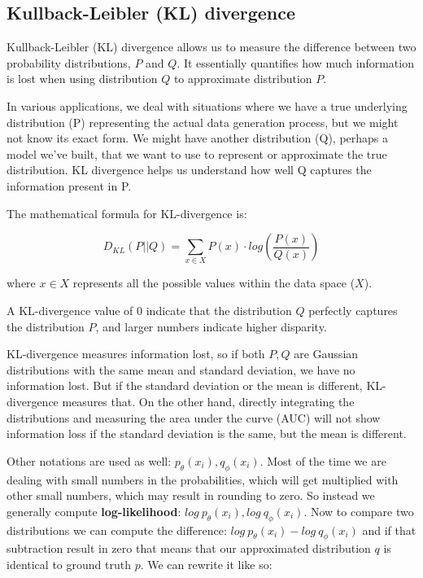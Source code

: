 \subsection{Kullback-Leibler (KL) divergence}
\label{appendix:kl_divergence}



Kullback-Leibler (KL) divergence allows us to measure the difference between two probability distributions, $P$ and $Q$. It essentially quantifies how much information is lost when using distribution $Q$ to approximate distribution $P$.

In various applications, we deal with situations where we have a true underlying distribution (P) representing the actual data generation process, but we might not know its exact form. We might have another distribution (Q), perhaps a model we've built, that we want to use to represent or approximate the true distribution. KL divergence helps us understand how well Q captures the information present in P.

The mathematical formula for KL-divergence is:

\begin{equation}
\label{eq:kl-divergence}
    D_{KL}(P || Q) = \sum_{x \in X} P(x) \cdot log(\frac{P(x)}{Q(x)})
\end{equation}

where $x \in X$ represents all the possible values within the data space ($X$).

A KL-divergence value of 0 indicate that the distribution $Q$ perfectly captures the distribution $P$, and larger numbers indicate higher disparity.

KL-divergence measures information lost, so if both $P,Q$ are Gaussian distributions with the same mean and standard deviation, we have no information lost. But if the standard deviation or the mean is different, KL-divergence measures that. On the other hand, directly integrating the distributions and measuring the area under the curve (AUC) will not show information loss if the standard deviation is the same, but the mean is different.


Other notations are used as well: $p_\theta(x_i), q_\phi(x_i)$. Most of the time we are dealing with small numbers in the probabilities, which will get multiplied with other small numbers, which may result in rounding to zero. So instead we generally compute \textbf{log-likelihood}: $log\ p_\theta(x_i), log\ q_\phi(x_i)$. Now to compare two distributions we can compute the difference: $log\ p_\theta(x_i) - log\ q_\phi(x_i)$ and if that subtraction result in zero that means that our approximated distribution $q$ is identical to ground truth $p$. We can rewrite it like so: 

